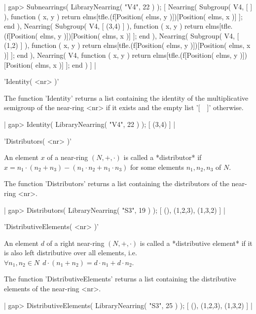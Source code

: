 |  gap> Subnearrings( LibraryNearring( "V4", 22 ) );
  [ Nearring( Subgroup( V4, [  ] ), function ( x, y )
          return elms[tfle.(f[Position( elms, y )])[Position( elms, x )]
             ];
      end ), Nearring( Subgroup( V4, [ (3,4) ] ), function ( x, y )
          return elms[tfle.(f[Position( elms, y )])[Position( elms, x )]
             ];
      end ), Nearring( Subgroup( V4, [ (1,2) ] ), function ( x, y )
          return elms[tfle.(f[Position( elms, y )])[Position( elms, x )]
             ];
      end ), Nearring( V4, function ( x, y )
          return elms[tfle.(f[Position( elms, y )])[Position( elms, x )]
             ];
      end ) ]
|

   
'Identity( <nr> )'  

The function 'Identity' returns a list containing the identity of the 
multiplicative semigroup of the near-ring <nr> 
if it exists and the empty list '[\ \ ]' otherwise.

|  gap> Identity( LibraryNearring( "V4", 22 ) );    
  [ (3,4) ]
|

   
'Distributors( <nr> )'  

An element $x$ of a near-ring $(N,+,\cdot)$ is called a *distributor*
if $x = n_1 \cdot (n_2 + n_3 ) - (n_1 \cdot n_2 + n_1 \cdot n_3 )$ for 
some elements $n_1, n_2, n_3$ of $N$.

The function 'Distributors' returns a list containing the distributors 
of the near-ring <nr>.
 
|  gap> Distributors( LibraryNearring( "S3", 19 ) );
  [ (), (1,2,3), (1,3,2) ]
|

   
'DistributiveElements( <nr> )'  

An element $d$ of a right near-ring $(N,+,\cdot)$ is called a 
*distributive element* if it is also left distributive over all elements,
i.e. 
$\forall n_1, n_2 \in N\:\ d \cdot (n_1 + n_2 ) = d \cdot n_1 + d \cdot n_2$. 

The function 'DistributiveElements' returns a list containing the 
distributive elements of the near-ring <nr>. 

|  gap> DistributiveElements( LibraryNearring( "S3", 25 ) );
  [ (), (1,2,3), (1,3,2) ]
|

